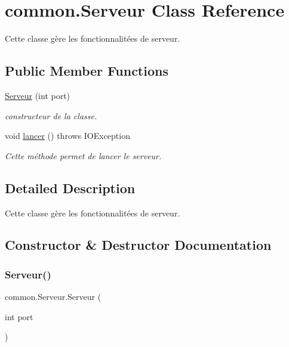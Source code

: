 \hypertarget{classcommon_1_1Serveur}{}\section{common.\+Serveur Class Reference}
\label{classcommon_1_1Serveur}


Cette classe gère les fonctionnalitées de serveur.  


\subsection*{Public Member Functions}
\begin{DoxyCompactItemize}
\item 
\hyperlink{classcommon_1_1Serveur_a43e88f40a6f46e43bf6b3c71eb4d9828}{Serveur} (int port)
\begin{DoxyCompactList}\small\item\em constructeur de la classe. \end{DoxyCompactList}\item 
void \hyperlink{classcommon_1_1Serveur_a9924019a4577e360dafa9ab6df2d4ffd}{lancer} ()  throws I\+O\+Exception 
\begin{DoxyCompactList}\small\item\em Cette méthode permet de lancer le serveur. \end{DoxyCompactList}\end{DoxyCompactItemize}


\subsection{Detailed Description}
Cette classe gère les fonctionnalitées de serveur. 

\subsection{Constructor \& Destructor Documentation}
\mbox{\label{classcommon_1_1Serveur_a43e88f40a6f46e43bf6b3c71eb4d9828}} 
\subsubsection{\texorpdfstring{Serveur()}{Serveur()}}
{\footnotesize\ttfamily common.\+Serveur.\+Serveur (\begin{DoxyParamCaption}\item[{int}]{port }\end{DoxyParamCaption})\hspace{0.3cm}{\ttfamily [inline]}}



